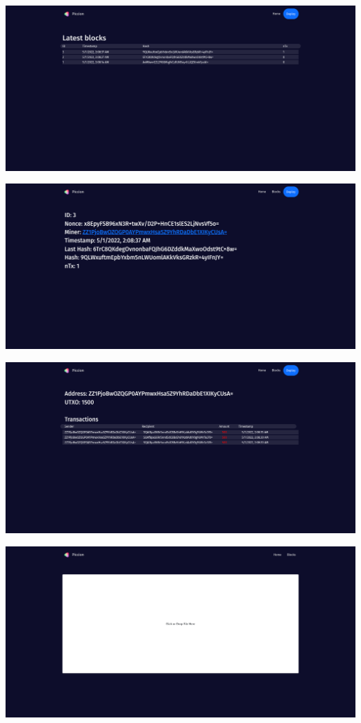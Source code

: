 \documentclass[../documentation.tex]{subfiles}
\begin{document}

\includegraphics[width=\textwidth]{images/website2}


\includegraphics[width=\textwidth]{images/website3}

\pagebreak


\includegraphics[width=\textwidth]{images/website4}


\includegraphics[width=\textwidth]{images/website5.png}
\end{document}
